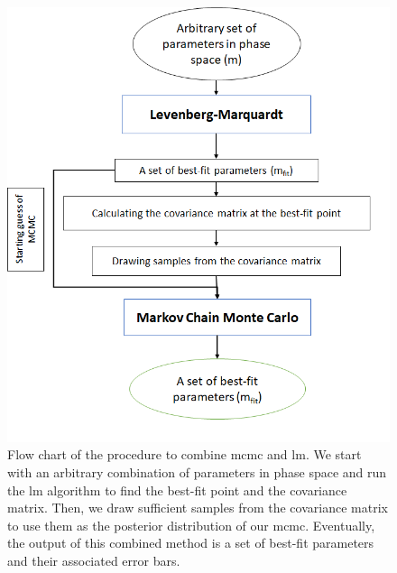 \documentclass[12pt, TexShade, letterpaper]{report}
\begin{document}
\begin{figure}[h!]
\centering
\includegraphics[scale =0.9]{combined_flow.png}
\caption[Flow chart of the procedure to combine \gls{mcmc} and \gls{lm}]{Flow chart of the procedure to combine \gls{mcmc} and \gls{lm}. We start with an arbitrary combination of parameters in phase space and run the \gls{lm} algorithm to find the best-fit point and the covariance matrix. Then, we draw sufficient samples from the covariance matrix to use them as the posterior distribution of our \gls{mcmc}. Eventually, the output of this combined method is a set of best-fit parameters and their associated error bars.}
\label{fig:combined_flow}
\end{figure}
\end{document}
